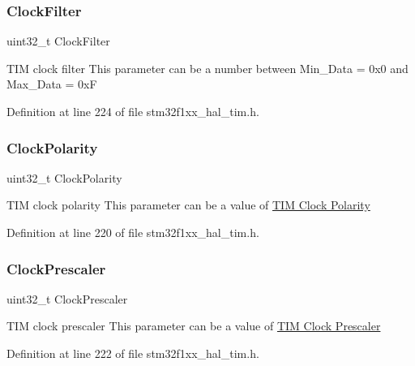 \subsubsection{\texorpdfstring{Clock\+Filter}{ClockFilter}}
{\footnotesize\ttfamily uint32\+\_\+t Clock\+Filter}

T\+IM clock filter This parameter can be a number between Min\+\_\+\+Data = 0x0 and Max\+\_\+\+Data = 0xF 

Definition at line 224 of file stm32f1xx\+\_\+hal\+\_\+tim.\+h.

\mbox{\label{struct_t_i_m___clock_config_type_def_a765acd064e3a8fb99ec74ae5109fc5ec}} 
\subsubsection{\texorpdfstring{Clock\+Polarity}{ClockPolarity}}
{\footnotesize\ttfamily uint32\+\_\+t Clock\+Polarity}

T\+IM clock polarity This parameter can be a value of \hyperlink{group___t_i_m___clock___polarity}{T\+IM Clock Polarity} 

Definition at line 220 of file stm32f1xx\+\_\+hal\+\_\+tim.\+h.

\mbox{\label{struct_t_i_m___clock_config_type_def_ab791f8fac403d508e1c53b6f27cf1f24}} 
\subsubsection{\texorpdfstring{Clock\+Prescaler}{ClockPrescaler}}
{\footnotesize\ttfamily uint32\+\_\+t Clock\+Prescaler}

T\+IM clock prescaler This parameter can be a value of \hyperlink{group___t_i_m___clock___prescaler}{T\+IM Clock Prescaler} 

Definition at line 222 of file stm32f1xx\+\_\+hal\+\_\+tim.\+h.

\mbox{\label{struct_t_i_m___clock_config_type_def_afe27815154e535b96e8fa1b4d2fdd596}} 
